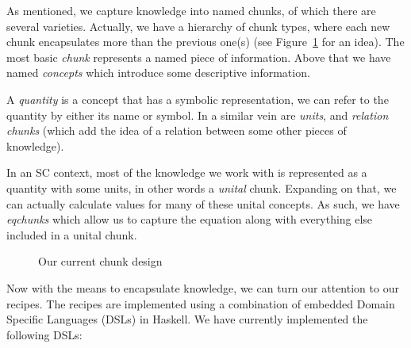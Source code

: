 \documentclass[preprint, 10pt]{sigplanconf}
\begin{document}
As mentioned, we capture knowledge into named chunks, of which there
are several varieties. Actually, we have a hierarchy of chunk types, where each
new chunk encapsulates more than the previous one(s) (see
Figure~\ref{fig:chunks} for an idea). The most basic \emph{chunk} represents a
named piece of information. Above that we have named \emph{concepts} which
introduce some descriptive information.

A \emph{quantity} is a concept that has a symbolic representation, we can refer
to the quantity by either its name or symbol. In a similar vein are
\emph{units}, %
and \emph{relation chunks} (which add the idea of a
relation between some other pieces of knowledge).

In an SC context, most of the knowledge we work with is represented as a
quantity with some units, in other words a \emph{unital} chunk. Expanding on
that, we can actually calculate values for many of these unital concepts. As
such, we have \emph{eqchunks} which allow us to capture the equation along with
everything else included in a unital chunk.

\begin{figure}
\begin{center}
\end{center}
\caption{Our current chunk design}
\label{fig:chunks}
\end{figure}

Now with the means to encapsulate knowledge, we can turn our attention to our
recipes. The recipes are implemented using a combination of embedded Domain
Specific Languages (DSLs) in Haskell. We have currently implemented the
following DSLs:
\end{document}
